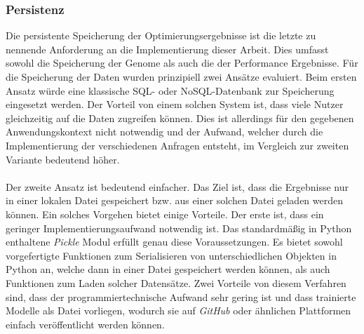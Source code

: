 \subsubsection{Persistenz}
Die persistente Speicherung der Optimierungsergebnisse ist die letzte zu nennende Anforderung an die Implementierung dieser Arbeit. Dies umfasst sowohl die Speicherung der Genome als auch die der Performance Ergebnisse. Für die Speicherung der Daten wurden prinzipiell zwei Ansätze evaluiert. Beim ersten Ansatz würde eine klassische SQL- oder NoSQL-Datenbank zur Speicherung eingesetzt werden. Der Vorteil von einem solchen System ist, dass viele Nutzer gleichzeitig auf die Daten zugreifen können. Dies ist allerdings für den gegebenen Anwendungskontext nicht notwendig und der Aufwand, welcher durch die Implementierung der verschiedenen Anfragen entsteht, im Vergleich zur zweiten Variante bedeutend höher.
\\\\
Der zweite Ansatz ist bedeutend einfacher. Das Ziel ist, dass die Ergebnisse nur in einer lokalen Datei gespeichert bzw. aus einer solchen Datei geladen werden können. Ein solches Vorgehen bietet einige Vorteile. Der erste ist, dass ein geringer Implementierungsaufwand notwendig ist. Das standardmäßig in Python enthaltene \emph{Pickle} Modul erfüllt genau diese Voraussetzungen. Es bietet sowohl vorgefertigte Funktionen zum Serialisieren von unterschiedlichen Objekten in Python an, welche dann in einer Datei gespeichert werden können, als auch Funktionen zum Laden solcher Datensätze. Zwei Vorteile von diesem Verfahren sind, dass der programmiertechnische Aufwand sehr gering ist und dass trainierte Modelle als Datei vorliegen, wodurch sie auf \emph{GitHub} oder ähnlichen Plattformen einfach veröffentlicht werden können.
\\\\
